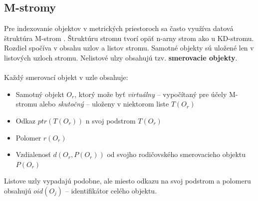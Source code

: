 \documentclass[12pt,oneside]{fithesis2}
\begin{document}
  
\subsection{M-stromy}
   Pre indexovanie objektov v metrických priestoroch sa často využíva datová štruktúra M-strom \cite{stromy}. Štruktúru stromu tvorí opäť n-arny strom ako u KD-stromu. Rozdiel spočíva v obsahu uzlov a listov stromu. Samotné objekty sú uložené len v listových uzloch stromu. Nelistové ulzy obsahujú tzv. \textbf{smerovacie objekty}. \\\\
Každý smerovací objekt v uzle obsahuje:
\begin{itemize}
\item Samotný objekt $O_r$, ktorý može byť \textit{virtuálny} -- vypočítaný pre účely M-stromu alebo \textit{skutočný} -- uloženy v niektorom liste $T(O_r)$
\item Odkaz $ptr(T(O_r))$ n svoj podstrom $T(O_r)$
\item Polomer $r(O_r)$
\item Vzdialenosť $d(O_r,P(O_r))$  od svojho rodičovského smerovacieho objektu $P(O_r)$
\end{itemize}
Listove uzly vypadajú podobne, ale miesto odkazu na svoj podstrom a polomeru obsahujú $oid(O_j)$ -- identifikátor celého objektu.\\
\end{document}
